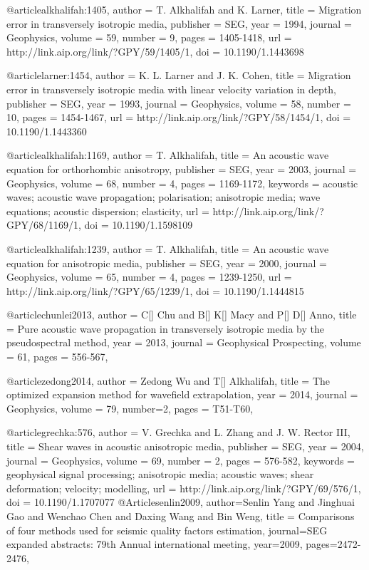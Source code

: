 {@article{alkhalifah:1405,
  author =	 {T. Alkhalifah and K. Larner},
  title =	 {Migration error in transversely isotropic media},
  publisher =	 {SEG},
  year =	 1994,
  journal =	 {Geophysics},
  volume =	 59,
  number =	 9,
  pages =	 {1405-1418},
  url =		 {http://link.aip.org/link/?GPY/59/1405/1},
  doi =		 {10.1190/1.1443698}
}

@article{larner:1454,
  author =	 {K. L. Larner and J. K. Cohen},
  title =	 {Migration error in transversely isotropic media with
                  linear velocity variation in depth},
  publisher =	 {SEG},
  year =	 1993,
  journal =	 {Geophysics},
  volume =	 58,
  number =	 10,
  pages =	 {1454-1467},
  url =		 {http://link.aip.org/link/?GPY/58/1454/1},
  doi =		 {10.1190/1.1443360}
}

@article{alkhalifah:1169,
  author =	 {T. Alkhalifah},
  title =	 {An acoustic wave equation for orthorhombic
                  anisotropy},
  publisher =	 {SEG},
  year =	 2003,
  journal =	 {Geophysics},
  volume =	 68,
  number =	 4,
  pages =	 {1169-1172},
  keywords =	 {acoustic waves; acoustic wave propagation;
                  polarisation; anisotropic media; wave equations;
                  acoustic dispersion; elasticity},
  url =		 {http://link.aip.org/link/?GPY/68/1169/1},
  doi =		 {10.1190/1.1598109}
}

@article{alkhalifah:1239,
  author =	 {T. Alkhalifah},
  title =	 {An acoustic wave equation for anisotropic media},
  publisher =	 {SEG},
  year =	 2000,
  journal =	 {Geophysics},
  volume =	 65,
  number =	 4,
  pages =	 {1239-1250},
  url =		 {http://link.aip.org/link/?GPY/65/1239/1},
  doi =		 {10.1190/1.1444815}
}

@article{chunlei2013,
  author =	 {C[] Chu and B[] K[] Macy and P[] D[] Anno},
  title =	 { Pure acoustic wave propagation in transversely isotropic media by the pseudospectral method},
  year =	 2013,
  journal =	 {Geophysical Prospecting},
  volume =	 61,
  pages =	 {556-567},
}

@article{zedong2014,
  author =	 {Zedong Wu and T[] Alkhalifah},
  title =	 {The optimized expansion method for wavefield extrapolation},
  year =	 2014,
  journal =	 {Geophysics},
  volume =	 79,
  number=2,
  pages =	 {T51-T60},
}

@article{grechka:576,
  author =	 {V. Grechka and L. Zhang and J.
                  W. Rector III},
  title =	 {Shear waves in acoustic anisotropic media},
  publisher =	 {SEG},
  year =	 2004,
  journal =	 {Geophysics},
  volume =	 69,
  number =	 2,
  pages =	 {576-582},
  keywords =	 {geophysical signal processing; anisotropic media;
                  acoustic waves; shear deformation; velocity;
                  modelling},
  url =		 {http://link.aip.org/link/?GPY/69/576/1},
  doi =		 {10.1190/1.1707077}
}
@Article{senlin2009,
  author={Senlin Yang and Jinghuai Gao and Wenchao Chen and Daxing Wang and Bin Weng},
  title = {Comparisons of four methods used for seismic quality factors estimation},
  journal={SEG expanded abstracts: 79th Annual international meeting},
  year=2009,
  pages={2472-2476},
}

}
